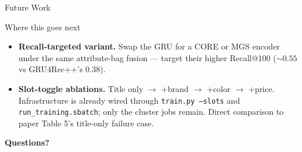 \documentclass[10pt,aspectratio=169]{beamer}
\newcommand{\code}[1]{\texttt{#1}}
\begin{document}
\begin{frame}{Future Work}
  \begin{block}{Where this goes next}
    \begin{itemize}\setlength\itemsep{0.4em}
      \item \textbf{Recall-targeted variant.} Swap the GRU for a CORE or MGS encoder under the same attribute-bag fusion --- target their higher Recall@100 (${\sim}0.55$ vs GRU4Rec++'s 0.38).
      \item \textbf{Slot-toggle ablations.} Title only $\to$ +brand $\to$ +color $\to$ +price. Infrastructure is already wired through \code{train.py --slots} and \code{run\_training.sbatch}; only the cluster jobs remain. Direct comparison to paper Table 5's title-only failure case.
    \end{itemize}
  \end{block}

  \vspace{1.5em}
  \begin{center}
    {\Huge\textbf{\textcolor{tuBlue}{Questions?}}}
  \end{center}
\end{frame}
\end{document}
